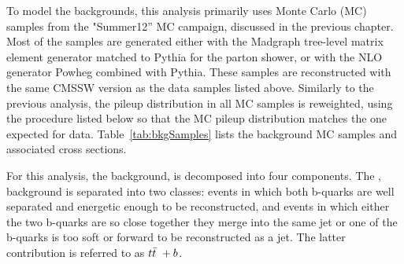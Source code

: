 \par To model the backgrounds, this analysis primarily uses Monte
Carlo (MC) samples from the "Summer12'' MC campaign, discussed in the
previous chapter.  Most of the samples are generated either with the
{\sc Madgraph} tree-level matrix element generator matched to {\sc
  Pythia} for the parton shower, or with the NLO generator {\sc
  Powheg} combined with {\sc Pythia}.  These samples are reconstructed
with the same CMSSW version as the data samples listed above.
Similarly to the previous analysis, the pileup distribution in all MC samples is
reweighted, using the procedure listed below so that the MC pileup
distribution matches the one expected for data.
Table~\ref{tab:bkgSamples} lists the background MC samples and
associated cross sections.  

\par  For this analysis, the \ttjets background, is decomposed into
four components.  The \ttbb, background is separated into two classes:
\ttbb events in which both b-quarks are well separated and energetic
enough to be reconstructed, and events in which either the two
b-quarks are so close together they merge into the same jet or one of
the b-quarks is too soft or forward to be reconstructed as a jet.  The
latter contribution is referred to as $t{\bar{t}}~+b$. 

